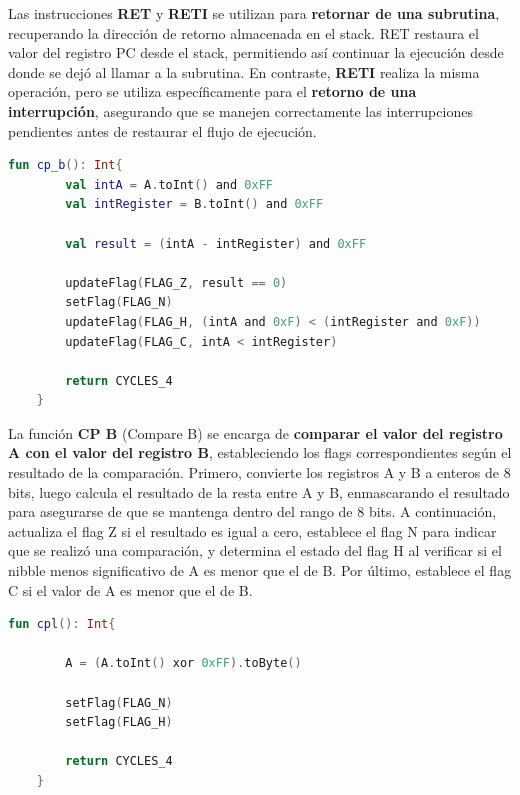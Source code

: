 Las instrucciones \textbf{RET} y \textbf{RETI} se utilizan para \textbf{retornar de una subrutina}, recuperando la dirección de retorno almacenada en el stack. RET restaura el valor del registro PC desde el stack, permitiendo así continuar la ejecución desde donde se dejó al llamar a la subrutina. En contraste, \textbf{RETI} realiza la misma operación, pero se utiliza específicamente para el \textbf{retorno de una interrupción}, asegurando que se manejen correctamente las interrupciones pendientes antes de restaurar el flujo de ejecución.

\begin{lstlisting}[language=Kotlin, caption={Operación CP}, label={code:kotlincp}]
    fun cp_b(): Int{
        val intA = A.toInt() and 0xFF
        val intRegister = B.toInt() and 0xFF

        val result = (intA - intRegister) and 0xFF

        updateFlag(FLAG_Z, result == 0)
        setFlag(FLAG_N)
        updateFlag(FLAG_H, (intA and 0xF) < (intRegister and 0xF))
        updateFlag(FLAG_C, intA < intRegister)
        
        return CYCLES_4
    }
\end{lstlisting}

La función \textbf{CP B} (Compare B) se encarga de \textbf{comparar el valor del registro A con el valor del registro B}, estableciendo los flags correspondientes según el resultado de la comparación. Primero, convierte los registros A y B a enteros de 8 bits, luego calcula el resultado de la resta entre A y B, enmascarando el resultado para asegurarse de que se mantenga dentro del rango de 8 bits. A continuación, actualiza el flag Z si el resultado es igual a cero, establece el flag N para indicar que se realizó una comparación, y determina el estado del flag H al verificar si el nibble menos significativo de A es menor que el de B. Por último, establece el flag C si el valor de A es menor que el de B.

\begin{lstlisting}[language=Kotlin, caption={Operación CPL}, label={code:kotlincpl}]
    fun cpl(): Int{

        A = (A.toInt() xor 0xFF).toByte()

        setFlag(FLAG_N)
        setFlag(FLAG_H)

        return CYCLES_4
    }
\end{lstlisting}

